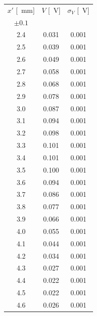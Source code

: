 \documentclass[10pt,oneside,a4paper]{article}
\begin{document}
\begin{minipage}{0.33\linewidth}
\begin{center}
\begin{tabular}{c|c|c}
$x'$ [\SI{}{mm}] & $V$ [\SI{}{V}] & $\sigma_V$ [\SI{}{V}] \\
 $\pm 0.1$ & & \\
\hline
  2.4 & 0.031 & 0.001 \\
  2.5 & 0.039 & 0.001 \\
  2.6 & 0.049 & 0.001 \\
  2.7 & 0.058 & 0.001 \\
  2.8 & 0.068 & 0.001 \\
  2.9 & 0.078 & 0.001 \\
  3.0 & 0.087 & 0.001 \\
  3.1 & 0.094 & 0.001 \\
  3.2 & 0.098 & 0.001 \\
  3.3 & 0.101 & 0.001 \\
  3.4 & 0.101 & 0.001 \\
  3.5 & 0.100 & 0.001 \\
  3.6 & 0.094 & 0.001 \\
  3.7 & 0.086 & 0.001 \\
  3.8 & 0.077 & 0.001 \\
  3.9 & 0.066 & 0.001 \\
  4.0 & 0.055 & 0.001 \\
  4.1 & 0.044 & 0.001 \\
  4.2 & 0.034 & 0.001 \\
  4.3 & 0.027 & 0.001 \\
  4.4 & 0.022 & 0.001 \\
  4.5 & 0.022 & 0.001 \\
  4.6 & 0.026 & 0.001 \\
\hline
\end{tabular}
\end{center}
\end{minipage}
\end{document}
